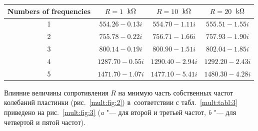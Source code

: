 \begin{table}[b!]
\begin{minipage}{.88\textwidth}
{}\vspace{-3mm}

\begin{tabular}[h]{c|c|c|c}%

 \hline 

\footnotesize Numbers of frequencies& \footnotesize $R=1$~$\rm k\Omega$ & \footnotesize $R=10$~$\rm k\Omega$ & \footnotesize $R=20$~$\rm k\Omega$\\

\hline

\rule{0mm}{12pt}%

1 & $554.26-0.13i$ & $554.70-1.11i$  & $555.51-1.55i$  \\

2 & $755.78-0.22i$  & $756.71-1.66i$ & $757.93-1.90i$\\

3 & $800.14-0.19i$ & $800.90-1.51i$ & $802.04-1.85i$\\

4 & $1287.70-0.55i$ & $1290.40-2.94i$ & $1292.20-2.43i$\\

5 & $1471.70-1.07i$ & $1477.10-5.41i$ & $1480.30-4.28i$\\

\hline

\end{tabular}



\end{minipage}

\end{table}



Влияние величины сопротивления $R$ на мнимую часть собственных частот колебаний пластинки (рис.~\ref{mult:fig:2}) в~соответствии с табл.~\ref{mult:tabl:3} приведено на рис.~\ref{mult:fig:3} ({\sl a} "--- для второй и третьей частот, {\sl b} "--- для четвертой и пятой частот).







